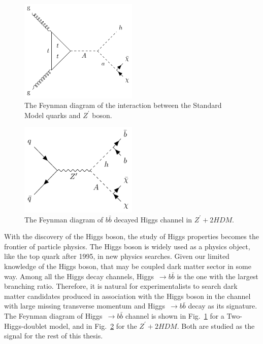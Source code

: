 \begin{figure}[htbp]
    \centering
    \includegraphics[width=0.5\textwidth]{chapters/c2/figures/two-higgs}
    \caption{The Feynman diagram of the interaction between the Standard Model quarks and $Z^{\prime}$ boson.}
    \label{fig:twohiggs}
\end{figure}

\begin{figure}[htbp]
    \centering
    \includegraphics[width=0.5\textwidth]{chapters/c2/figures/z-prime-2hdm}
    \caption{The Feynman diagram of $b\bar{b}$ decayed Higgs channel in $Z^{\prime}+2HDM$.}
    \label{fig:c2zprime2hdm}
\end{figure}


\par With the discovery of the Higgs boson, the study of Higgs properties becomes the frontier of particle physics. The Higgs boson is widely used as a physics object, like the top quark after 1995, in new physics searches. Given our limited knowledge of the Higgs boson, that may be coupled dark matter sector in some way. Among all the Higgs decay channels, Higgs~$\rightarrow b\bar{b}$ is the one with the largest branching ratio. Therefore, it is natural for experimentalists to search dark matter candidates produced in association with the Higgs boson in the channel with large missing transverse momentum and Higgs~$\rightarrow b\bar{b}$ decay as its signature. The Feynman diagram of Higgs~$\rightarrow b\bar{b}$ channel is shown in Fig.~\ref{fig:twohiggs} for a Two-Higgs-doublet model, and in Fig.~\ref{fig:c2zprime2hdm} for the $Z^{\prime}+2HDM$. Both are studied as the signal for the rest of this thesis.

